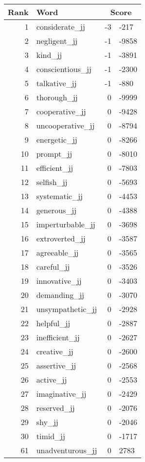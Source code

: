 \begin{longtable}[!htbp]{| rlr@{.}l |}
    \hline
    \textbf{Rank} & \textbf{Word} & \multicolumn{2}{c|}{\textbf{Score}} \\
    \hline
    \endhead
    1 & considerate\_jj & -3 & -217 \\
    2 & negligent\_jj & -1 & -9858 \\
    3 & kind\_jj & -1 & -3891 \\
    4 & conscientious\_jj & -1 & -2300 \\
    5 & talkative\_jj & -1 & -880 \\
    6 & thorough\_jj & 0 & -9999 \\
    7 & cooperative\_jj & 0 & -9428 \\
    8 & uncooperative\_jj & 0 & -8794 \\
    9 & energetic\_jj & 0 & -8266 \\
    10 & prompt\_jj & 0 & -8010 \\
    11 & efficient\_jj & 0 & -7803 \\
    12 & selfish\_jj & 0 & -5693 \\
    13 & systematic\_jj & 0 & -4453 \\
    14 & generous\_jj & 0 & -4388 \\
    15 & imperturbable\_jj & 0 & -3698 \\
    16 & extroverted\_jj & 0 & -3587 \\
    17 & agreeable\_jj & 0 & -3565 \\
    18 & careful\_jj & 0 & -3526 \\
    19 & innovative\_jj & 0 & -3403 \\
    20 & demanding\_jj & 0 & -3070 \\
    21 & unsympathetic\_jj & 0 & -2928 \\
    22 & helpful\_jj & 0 & -2887 \\
    23 & inefficient\_jj & 0 & -2627 \\
    24 & creative\_jj & 0 & -2600 \\
    25 & assertive\_jj & 0 & -2568 \\
    26 & active\_jj & 0 & -2553 \\
    27 & imaginative\_jj & 0 & -2429 \\
    28 & reserved\_jj & 0 & -2076 \\
    29 & shy\_jj & 0 & -2046 \\
    30 & timid\_jj & 0 & -1717 \\
    61 & unadventurous\_jj & 0 & 2783 \\

\end{longtable}
